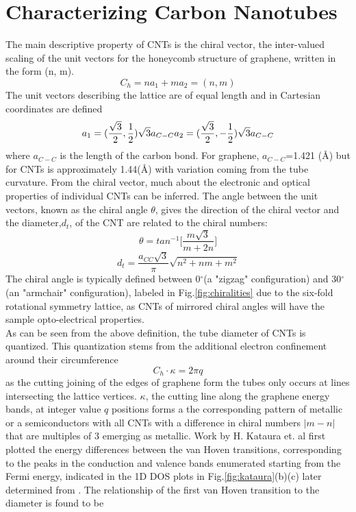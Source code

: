 \section{Characterizing Carbon Nanotubes}
The main descriptive property of CNTs is the chiral vector, the inter-valued scaling of the unit vectors for the honeycomb structure of graphene, written in the form (n, m).
\begin{equation}
	C_h = na_1 + ma_2 = (n, m)
\end{equation}
The unit vectors describing the lattice are of equal length and in Cartesian coordinates are defined
\begin{equation}
	a_1 = (\frac{\sqrt3}{2}, \frac{1}{2})\sqrt{3}a_{C-C}\\
	a_2 = (\frac{\sqrt3}{2}, -\frac{1}{2})\sqrt{3}a_{C-C}
	\label{unit_vecs}
\end{equation}
 where $a_{C-C}$ is the length of the carbon bond. For graphene, $a_{C-C}$=1.421 (\AA) but for CNTs is approximately 1.44(\AA) with variation coming from the tube curvature\cite{saito}. From the chiral vector, much about the electronic and optical properties of individual CNTs can be inferred. The angle between the unit vectors, known as the chiral angle $\theta$, gives the direction of the chiral vector and the diameter,$d_t$, of the CNT are related to the chiral numbers:
\begin{equation}
	\theta = tan^{-1}\Bigg[\frac{m\sqrt{3}}{m + 2n}\Bigg]
\end{equation}
\begin{equation}
	d_t = \frac{a_{CC}\sqrt{3}}{\pi} \sqrt{n^2 + nm + m^2}
\end{equation}
The chiral angle is typically defined between 0${}^\circ$(a "zigzag" configuration) and 30${}^\circ$(an "armchair" configuration), labeled in Fig.\ref{fig:chiralities} due to the six-fold rotational symmetry lattice, as CNTs of mirrored chiral angles will have the sample opto-electrical properties. \\
As can be seen from the above definition, the tube diameter of CNTs is quantized. This quantization stems from the additional electron confinement around their circumference
\begin{equation}
	C_h\cdot\kappa = 2\pi q
\end{equation}
 as the cutting joining of the edges of graphene form the tubes only occurs at lines intersecting the lattice vertices. $\kappa$, the cutting line along the graphene energy bands, at integer value $q$ positions forms a the corresponding pattern of  metallic or a semiconductors \cite{dresselhaus} with all CNTs with a difference in chiral numbers $|m-n|$ that are multiples of 3 emerging as metallic. Work by H. Kataura et. al \cite{kataura} first plotted the energy differences between the van Hoven transitions, corresponding to the peaks in the conduction and valence bands enumerated starting from the Fermi energy, indicated in the 1D DOS plots in Fig.\ref{fig:kataura}(b)(c) later determined from \cite{saito}. The relationship of the first van Hoven transition to the diameter is found to be 
